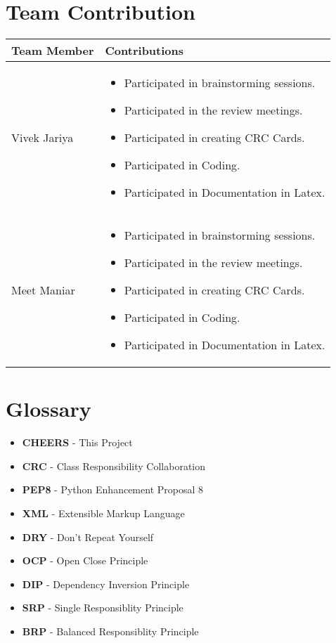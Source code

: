 \documentclass[11pt]{article}
\begin{document}
\section{Team Contribution}

	\begin{center}
		\begin{tabular}{ | l  | p{8cm} |}
			\hline
			Team Member & Contributions  \\
			\hline
			[OK] Vivek Jariya & 
			\begin{itemize}
				\item Participated in brainstorming sessions.
				\item Participated in the review meetings.
				\item Participated in creating CRC Cards.
				\item Participated in Coding.
				\item Participated in Documentation in Latex.
			\end{itemize}\\ \hline
			[OK] Meet Maniar & 
			\begin{itemize}
				\item Participated in brainstorming sessions.
				\item Participated in the review meetings.
				\item Participated in creating CRC Cards.
				\item Participated in Coding.
				\item Participated in Documentation in Latex.
			\end{itemize}\\ \hline
		\end{tabular}
	\end{center}	

\section{Glossary}

	\begin{itemize}
		\item \textbf{CHEERS} - This Project
		\item \textbf{CRC} - Class Responsibility Collaboration
		\item \textbf{PEP8} - Python Enhancement Proposal 8
		\item \textbf{XML} - Extensible Markup Language 
		\item \textbf{DRY} - Don't Repeat Yourself
		\item \textbf{OCP} - Open Close Principle	
		\item \textbf{DIP} - Dependency Inversion Principle
		\item \textbf{SRP} - Single Responsiblity Principle
		\item \textbf{BRP} - Balanced Responsiblity Principle	
	\end{itemize}
\end{document}
